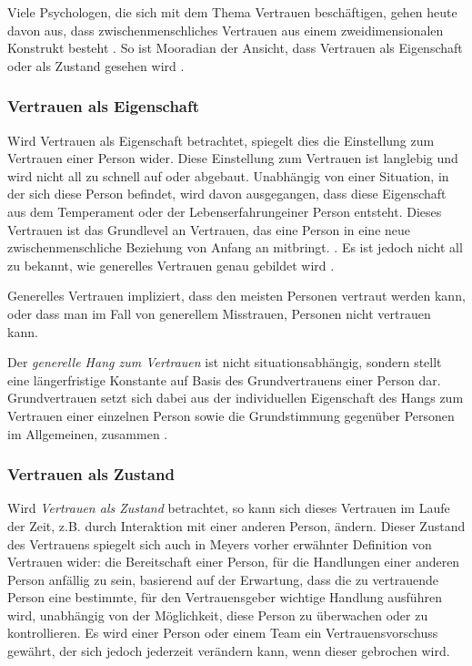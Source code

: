 \documentclass[a4paper,11pt]{article}%
\renewcommand{\\}{\vspace*{0.5\baselineskip} \newline}
\begin{document}
Viele Psychologen, die sich mit dem Thema Vertrauen beschäftigen, gehen heute davon aus, dass zwischenmenschliches Vertrauen aus einem zweidimensionalen Konstrukt besteht \citep{johnson2005cognitive} \citep{cook1980new}. So ist Mooradian der Ansicht, dass Vertrauen als \dq{}Eigenschaft\dq{} oder als \dq{}Zustand\dq{} gesehen wird \citep[p.524-525]{mooradian2006trusts}.

	\subsubsection{Vertrauen als Eigenschaft }
\label{Vertrauen als Eigenschaft}
Wird Vertrauen als Eigenschaft betrachtet, spiegelt dies die Einstellung zum Vertrauen einer Person wider. Diese Einstellung zum Vertrauen ist langlebig und wird nicht all zu schnell auf oder abgebaut. Unabhängig von einer Situation, in der sich diese Person befindet, wird davon ausgegangen, dass diese Eigenschaft aus dem Temperament oder der Lebenserfahrungeiner Person entsteht. Dieses Vertrauen ist das Grundlevel an Vertrauen, das eine Person in eine neue zwischenmenschliche Beziehung von Anfang an mitbringt. \citep[p.11]{couch1996assessment}. Es ist jedoch nicht all zu bekannt, wie generelles Vertrauen genau gebildet wird \citep[p.409]{stolle2002trusting}.

Generelles Vertrauen impliziert, dass den meisten Personen vertraut werden kann, oder dass man im Fall von generellem Misstrauen, Personen nicht vertrauen kann. \citep[p.409]{stolle2002trusting}

Der \textit{generelle Hang zum Vertrauen} ist nicht situationsabhängig, sondern stellt eine längerfristige Konstante auf Basis des Grundvertrauens einer Person dar. Grundvertrauen setzt sich dabei aus der individuellen Eigenschaft des Hangs zum Vertrauen einer einzelnen Person sowie die Grundstimmung gegenüber Personen im Allgemeinen, zusammen \citep[p.11]{couch1996assessment}.

	\subsubsection{Vertrauen als Zustand}
\label{Vertrauen als Zustand}
Wird \textit{Vertrauen als Zustand} betrachtet, so kann sich dieses Vertrauen im Laufe der Zeit, z.B. durch Interaktion mit einer anderen Person, ändern. Dieser Zustand des Vertrauens spiegelt sich auch in Meyers \citep[p.712]{mayer1995integrative} vorher erwähnter Definition von Vertrauen wider:\\ \dq die Bereitschaft einer Person, für die Handlungen einer anderen Person anfällig zu sein, basierend auf der Erwartung, dass die zu vertrauende Person eine bestimmte, für den Vertrauensgeber wichtige Handlung ausführen wird, unabhängig von der Möglichkeit, diese Person zu überwachen oder zu kontrollieren.\dq{} \\
Es wird einer Person oder einem Team ein Vertrauensvorschuss gewährt, der sich jedoch jederzeit verändern kann, wenn dieser gebrochen wird.
\end{document}
